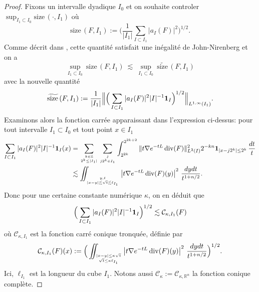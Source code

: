 \documentclass[11pt]{amsart}
\DeclareMathOperator{\dive}{div}
\newcommand{\sssize}{\widetilde{\text{size}\,}}
\newcommand{\size}{{\text{size}\,}}
\newcommand{\rr}{\mathbb}
\begin{document}
\begin{proof}
Fixons un intervalle dyadique $I_0$ et on souhaite controler $\sup_{I_1 \subset I_0} \size(\cdot,I_1)$ o\`u
$$ \size(F,I_1):= \Big(\frac{1}{|I_1|} \sum_{I\subset I_1} |a_I(F)|^2\Big)^{1/2}.$$
Comme d\'ecrit dans \cite[Lemma 4.2]{MTTBiest0}, cette quantit\'e satisfait une in\'egalit\'e de John-Nirenberg et on a
\begin{equation} \sup_{I_1 \subset I_0} \ \size(F,I_1) \ \lesssim \ \sup_{I_1 \subset I_0} \ \sssize(F,I_1)  \label{eq:size0}
\end{equation}
avec la nouvelle quantit\'e 
$$ \sssize(F,I_1):= \frac{1}{|I_1|} \Big\| \Big(\sum_{I\subset I_1} |a_I(F)|^2   |I|^{-1} {\bf 1}_I\Big)^{1/2} \Big\|_{L^{1,\infty}(I_1)}.$$
Examinons alors la fonction carr\'ee apparaissant dans l'expression ci-dessus: pour tout intervalle $I_1 \subset I_0$ et tout point $x\in I_1$
\begin{align*}
\sum_{I\subset I_1} |a_I(F)|^2   |I|^{-1} {\bf 1}_I(x) & = \sum_{\genfrac{}{}{0pt}{}{k\in {\rr Z}}{2^k \leq |I_1|}} \sum_{\genfrac{}{}{0pt}{}{j}{j2^k \in I_1}}  
\int_{2^{2k}}^{2^{2k+2}}  \| t \nabla e^{-tL}  \dive(F) \|_{L^2(I)}^2  2^{-kn} {\bf 1}_{|x-j2^{k}|\leq 2^k}  \, \frac{dt}{t} \\
& \lesssim  \iint_{\genfrac{}{}{0pt}{}{y,t}{|x-y|\lesssim \sqrt{t}\lesssim \ell_{I_1}}} \left| t\nabla e^{-tL}  \dive(F)(y) \right|^2 \, \frac{dydt}{t^{1+n/2}}.
\end{align*}
Donc pour une certaine constante num\'erique $\kappa$, on en d\'eduit que 
$$ \Big(\sum_{I\subset I_1} |a_I(F)|^2   |I|^{-1} {\bf 1}_I \Big)^{1/2} \lesssim {\mathcal C}_{\kappa,I_1}(F)$$
o\`u ${\mathcal C}_{\kappa,I_1}$ est la fonction carr\'e conique tronqu\'ee, d\'efinie par
$$ {\mathcal C}_{\kappa,I_1} (F)(x) := \Big(\iint_{\genfrac{}{}{0pt}{}{|x-y|\leq \kappa \sqrt{t}}{\sqrt{t}\leq \kappa \ell_{I_1}}} \left| t \nabla e^{-tL}  \dive(F)(y) \right|^2 \, \frac{dydt}{t^{1+n/2}}\Big)^{1/2}.$$ 
Ici, $\ell_{I_1}$ est la longueur du cube $I_1$.
Notons aussi ${\mathcal C}_\kappa:={\mathcal C}_{\kappa,{\rr R}^n}$ la fonction conique compl\`ete. 


\end{proof}
\end{document}
